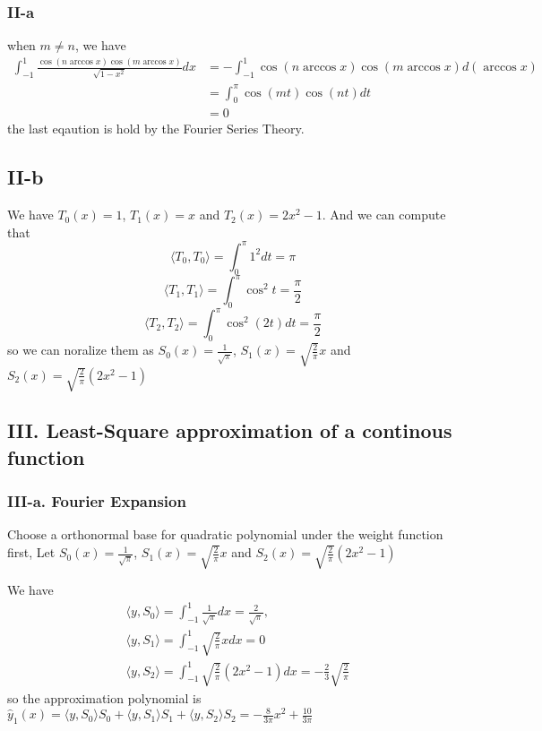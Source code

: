 \documentclass[a4paper]{article}
\newcommand{\innerProduct}[2]{\langle #1 , #2\rangle}
\begin{document}
\subsubsection*{II-a}
when \( m \neq n \), we have 
\begin{align*}
    \int_{-1}^{1}\frac{\cos(n\arccos{x})\cos(m\arccos{x})}{\sqrt{1-x^2}}dx  &= -\int_{-1}^{1} \cos(n\arccos{x})\cos(m\arccos{x}) 
    d(\arccos x) \\   & = \int_{0}^{\pi} \cos (mt) \cos(nt) dt \\& = 0
\end{align*}
the last eqaution is hold by the Fourier Series Theory.
\subsection*{II-b}
We have \(T_0(x) = 1\), \(T_1(x) = x\) and \(T_2(x) = 2x^2-1\). And we can compute that 
\[\innerProduct{T_0}{T_0} =\int_{0}^{\pi} 1^2 dt = \pi  \]
\[\innerProduct{T_1}{T_1} = \int_{0}^{\pi} \cos^2t =\frac{\pi}{2} \]
\[\innerProduct{T_2}{T_2} = \int_{0}^{\pi} \cos^2(2t)dt = \frac{\pi}{2}\]
so we can noralize them as \({S_0(x)} = \frac{1}{\sqrt{\pi}}\), \(S_1(x) = \sqrt{\frac{2}{\pi}}x\) and 
\({S_2(x)} = \sqrt{\frac{2}{\pi}}(2x^2-1)\)

\subsection*{III. Least-Square approximation of a continous function}
\subsubsection*{III-a. Fourier Expansion}
Choose a orthonormal base for quadratic polynomial under the weight function first, Let \({S_0(x)} = \frac{1}{\sqrt{\pi}}\), \(S_1(x) = \sqrt{\frac{2}{\pi}}x\) and 
\({S_2(x)} = \sqrt{\frac{2}{\pi}}(2x^2-1)\)

We have \begin{align*}
    &\innerProduct{y}{S_0} =\int_{-1}^{1}\frac{1}{\sqrt{\pi}}dx = \frac{2}{\sqrt{\pi}},\\
    &\innerProduct{y}{S_1} =\int_{-1}^{1}\sqrt{\frac{2}{\pi}}xdx = 0\\
    &\innerProduct{y}{S_2} =\int_{-1}^{1}\sqrt{\frac{2}{\pi}}(2x^2-1)dx = -\frac{2}{3}\sqrt{\frac{2}{\pi}}
\end{align*}
so the approximation polynomial is \(\hat{y}_1(x) =\innerProduct{y}{S_0}S_0 + \innerProduct{y}{S_1}S_1 + \innerProduct{y}{S_2}S_2 = -\frac{8}{3\pi}
x^2 + \frac{10}{3\pi}  \)
\end{document}
